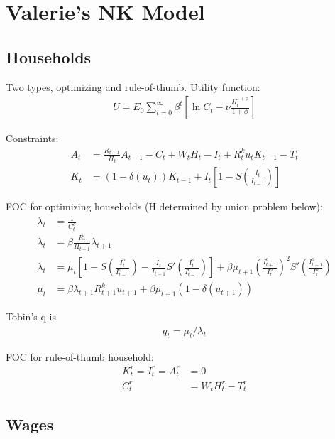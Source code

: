 \documentclass[11pt]{article}
\begin{document}
\section{Valerie's NK Model}

\subsection{Households}

Two types, optimizing and rule-of-thumb. Utility function:
\begin{align*}
	U = E_0 \sum_{t=0}^{\infty}\beta^t \left[\ln C_t - \nu \frac{H_t^{1+\phi}}{1+\phi}\right]
\end{align*}


Constraints:
\begin{align*}
	A_t &= \frac{R_{t-1}}{\Pi_t}A_{t-1} - C_t + W_t H_t - I_t + R_t^k u_{t} K_{t-1} - T_t \\
	K_t &=  (1-\delta(u_t))K_{t-1} + I_t \left[1-S\left(\frac{I_t}{I_{t-1}}\right)\right] 
\end{align*}

FOC for optimizing households (H determined by union problem below):
\begin{align*}
	\lambda_t &= \frac{1}{C_t^o} \\
	\lambda_t &= \beta \frac{R_t}{\Pi_{t+1}} \lambda_{t+1} \\
	\lambda_t &= \mu_t \left[1-S\left(\frac{I_t^o}{I_{t-1}^o}\right)  -\frac{I_t}{I_{t-1}}S'\left(\frac{I_t^o}{I_{t-1}^o}\right)\right] + \beta \mu_{t+1}\left(\frac{I_{t+1}^o}{I_t^o}\right)^2 S'\left(\frac{I_{t+1}^o}{I_{t}^o}\right)\\
	\mu_t &= \beta\lambda_{t+1}R_{t+1}^k u_{t+1} + \beta\mu_{t+1}(1-\delta(u_{t+1})) 
\end{align*}

Tobin's q is 
\begin{align*}
	q_t = \mu_t / \lambda_t	
\end{align*}


FOC for rule-of-thumb household:
\begin{align*}
	K_t^r=I_t^r=A_t^r&=0 \\
	C_t^r &= W_t H_t^r - T_t^r
\end{align*}





\subsection{Wages}
\end{document}
